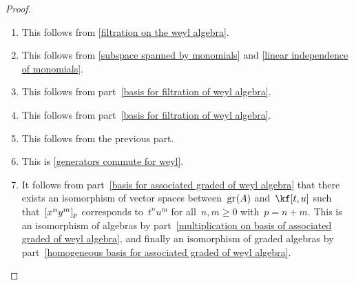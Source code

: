\begin{proof}
	\leavevmode
	\begin{enumerate}
		\item
			This follows from \cref{filtration on the weyl algebra}.
		\item
			This follows from \cref{subspace spanned by monomials} and \cref{linear independence of monomials}.
		\item
			This follows from part~\ref{basis for filtration of weyl algebra}.
		\item
			This follows from part~\ref{basis for filtration of weyl algebra}.
		\item
			This follows from the previous part.
		\item
			This is \cref{generators commute for weyl}. 
		\item
			It follows from part~\ref{basis for associated graded of weyl algebra} that there exists an isomorphism of vector spaces between~$\gr(A)$ and~$\kf[t,u]$ such that~$\lbrack x^n y^m \rbrack_p$ corresponds to~$t^n u^m$ for all~$n, m \geq 0$ with~$p = n + m$.
			This is an isomorphism of algebras by part~\ref{multiplication on basis of associated graded of weyl algebra}, and finally an isomorphism of graded algebras by part~\ref{homogeneous basis for associated graded of weyl algebra}.
		\qedhere
	\end{enumerate}
\end{proof}


